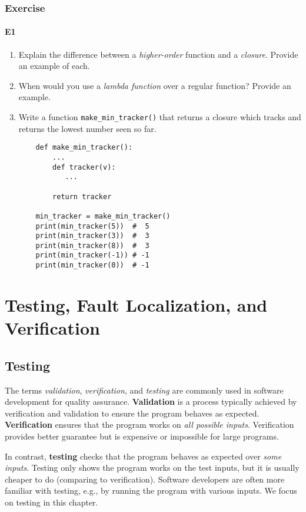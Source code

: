 \documentclass[oneside,11pt,dvipsnames]{book}
\newcommand{\code}[1]{\texttt{#1}}
\begin{document}
\section{Exercise}

\subsection{E1}
\begin{enumerate}
    \item Explain the difference between a \emph{higher-order} function and a \emph{closure}. Provide an example of each.
    \item When would you use a \emph{lambda function} over a regular function? Provide an example.
    \item Write a function \code{make\_min\_tracker()} that returns a closure which tracks and returns the lowest number seen so far.
    \begin{lstlisting}
    def make_min_tracker():
        ...
        def tracker(v):
           ...
        
        return tracker

    min_tracker = make_min_tracker()
    print(min_tracker(5))  #  5
    print(min_tracker(3))  #  3
    print(min_tracker(8))  #  3
    print(min_tracker(-1)) # -1
    print(min_tracker(0))  # -1
    \end{lstlisting}
\end{enumerate}

\part{Testing, Fault Localization, and Verification}
\chapter{Testing}\label{chapter:testing}


The terms \emph{validation}, \emph{verification}, and \emph{testing} are commonly used in software development for quality assurance. \textbf{Validation} is a process typically achieved by verification and validation to ensure the program behaves as expected. \textbf{Verification} ensures that the program works on \emph{all possible inputs}. Verification provides better guarantee but is expensive or impossible for large programs.

In contrast, \textbf{testing} checks that the program behaves as expected over \emph{some inputs}. Testing only shows the program works on the test inputs, but it is usually cheaper to do (comparing to verification). Software developers are often more familiar with testing, e.g., by running the program with various inputs. We focus on testing in this chapter.  
\end{document}
